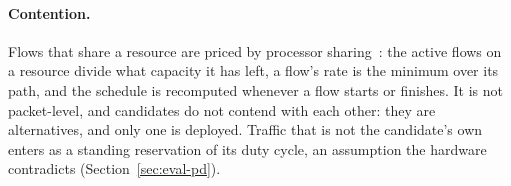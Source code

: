 \paragraph{Contention.}
Flows that share a resource are priced by processor
sharing~\cite{kleinrock1967,massoulie1999}: the active flows
on a resource divide what capacity it has left, a flow's rate is the minimum
over its path, and the schedule is recomputed whenever a flow starts or
finishes. It is not packet-level, and candidates do not contend with each
other: they are alternatives, and only one is deployed. Traffic that is not
the candidate's own enters as a standing reservation of its duty cycle, an
assumption the hardware contradicts (Section~\ref{sec:eval-pd}).
